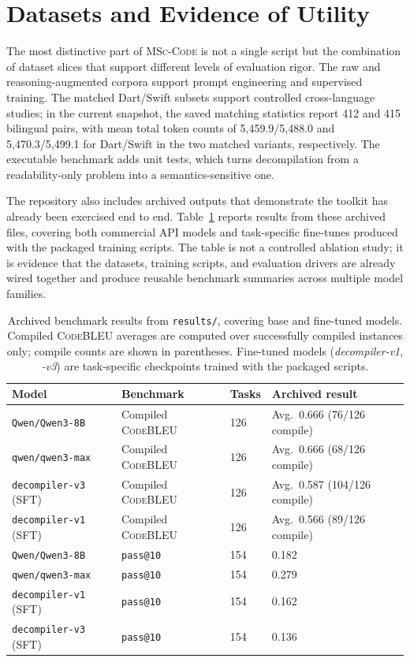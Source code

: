 \documentclass[sigconf,review]{acmart}
\begin{document}
\section{Datasets and Evidence of Utility}
The most distinctive part of \textsc{MSc-Code} is not a single script but the combination of dataset slices that support different levels of evaluation rigor. The raw and reasoning-augmented corpora support prompt engineering and supervised training. The matched Dart/Swift subsets support controlled cross-language studies; in the current snapshot, the saved matching statistics report 412 and 415 bilingual pairs, with mean total token counts of 5,459.9/5,488.0 and 5,470.3/5,499.1 for Dart/Swift in the two matched variants, respectively. The executable benchmark adds unit tests, which turns decompilation from a readability-only problem into a semantics-sensitive one.

The repository also includes archived outputs that demonstrate the toolkit has already been exercised end to end. Table~\ref{tab:results} reports results from these archived files, covering both commercial API models and task-specific fine-tunes produced with the packaged training scripts. The table is not a controlled ablation study; it is evidence that the datasets, training scripts, and evaluation drivers are already wired together and produce reusable benchmark summaries across multiple model families.

\begin{table}[t]
\caption{Archived benchmark results from \texttt{results/}, covering base and fine-tuned models. Compiled \textsc{CodeBLEU} averages are computed over successfully compiled instances only; compile counts are shown in parentheses. Fine-tuned models (\textit{decompiler-v1}, \textit{-v3}) are task-specific checkpoints trained with the packaged scripts.}
\label{tab:results}
\centering
\footnotesize
\begin{tabular}{p{}p{}p{}p{}}
\toprule
\textbf{Model} & \textbf{Benchmark} & \textbf{Tasks} & \textbf{Archived result} \\
\midrule
\texttt{Qwen/Qwen3-8B} & Compiled \textsc{CodeBLEU} & 126 & Avg.\ 0.666 (76/126 compile) \\
\texttt{qwen/qwen3-max} & Compiled \textsc{CodeBLEU} & 126 & Avg.\ 0.666 (68/126 compile) \\
\texttt{decompiler-v3} (SFT) & Compiled \textsc{CodeBLEU} & 126 & Avg.\ 0.587 (104/126 compile) \\
\texttt{decompiler-v1} (SFT) & Compiled \textsc{CodeBLEU} & 126 & Avg.\ 0.566 (89/126 compile) \\
\texttt{Qwen/Qwen3-8B} & \texttt{pass@10} & 154 & 0.182 \\
\texttt{qwen/qwen3-max} & \texttt{pass@10} & 154 & 0.279 \\
\texttt{decompiler-v1} (SFT) & \texttt{pass@10} & 154 & 0.162 \\
\texttt{decompiler-v3} (SFT) & \texttt{pass@10} & 154 & 0.136 \\
\bottomrule
\end{tabular}
\end{table}
\end{document}
